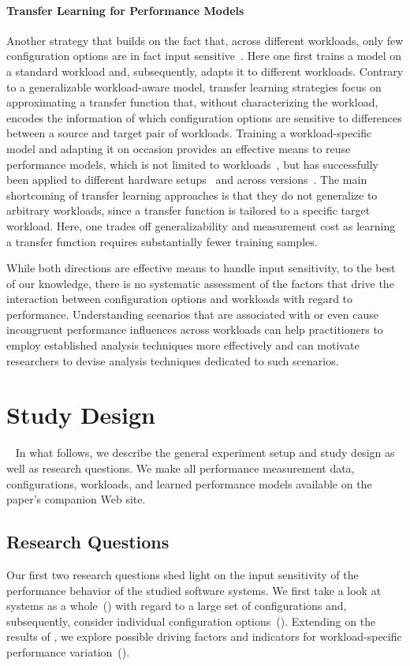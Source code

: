 \paragraph{Transfer Learning for Performance Models}\label{sec:transfer}
Another strategy that builds on the fact that, across different workloads, only few configuration options are in fact input sensitive~\cite{jamishidi_transfer_2017}. Here one first trains a model on a standard workload and, subsequently, adapts it to different workloads. Contrary to a generalizable workload-aware model, transfer learning strategies focus on approximating a transfer function that, without characterizing the workload, encodes the information of which configuration options are sensitive to differences between a source and target pair of workloads. Training a workload-specific model and adapting it on occasion provides an effective means to reuse performance models, which is not limited to workloads~\cite{jamshidi_learning_2018}, but has successfully been applied to different hardware setups~\cite{ding_bayesian_2020,valov_transferring_performance_2017} and across versions~\cite{martin_transfer_2021}. The main shortcoming of transfer learning approaches is that they do not generalize to arbitrary workloads, since a transfer function is tailored to a specific target workload. Here, one trades off generalizability and measurement cost as learning a transfer function requires substantially fewer training samples.

While both directions are effective means to handle input sensitivity, to the best of our knowledge, there is no systematic assessment of the factors that drive the interaction between configuration options and workloads with regard to performance. Understanding scenarios that are associated with or even cause incongruent performance influences across workloads can help practitioners to employ established analysis techniques more effectively and can motivate researchers to devise analysis techniques dedicated to such scenarios.

\section{Study Design}~\label{sec:study}
In what follows, we describe the general experiment setup and study design as well as research questions. We make all performance measurement data, configurations, workloads, and learned performance models available on the paper's companion Web site.

\subsection{Research Questions}
Our first two research questions shed light on the input sensitivity of the performance behavior of the studied software systems. We first take a look at systems as a whole~() with regard to a large set of configurations and, subsequently, consider individual configuration options~(). Extending on the results of , we explore possible driving factors and indicators for workload-specific performance variation~().

